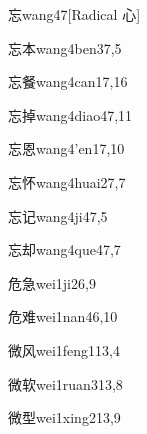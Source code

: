 \begin{entry}{忘}{wang4}{7}[Radical 心]
\end{entry}

\begin{entry}{忘本}{wang4ben3}{7,5}
\end{entry}

\begin{entry}{忘餐}{wang4can1}{7,16}
\end{entry}

\begin{entry}{忘掉}{wang4diao4}{7,11}
\end{entry}

\begin{entry}{忘恩}{wang4'en1}{7,10}
\end{entry}

\begin{entry}{忘怀}{wang4huai2}{7,7}
\end{entry}

\begin{entry}{忘记}{wang4ji4}{7,5}
\end{entry}

\begin{entry}{忘却}{wang4que4}{7,7}
\end{entry}

\begin{entry}{危急}{wei1ji2}{6,9}
\end{entry}

\begin{entry}{危难}{wei1nan4}{6,10}
\end{entry}

\begin{entry}{微风}{wei1feng1}{13,4}
\end{entry}

\begin{entry}{微软}{wei1ruan3}{13,8}
\end{entry}

\begin{entry}{微型}{wei1xing2}{13,9}
\end{entry}

